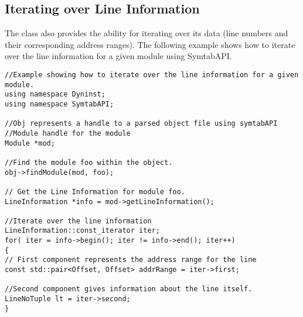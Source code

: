 \subsection{Iterating over Line Information}\label{LineNoIterating}
The  class also provides the ability for iterating over its data (line numbers and their corresponding address ranges). The following example shows how to iterate over the line information for a given module using SymtabAPI.

\begin{lstlisting}
//Example showing how to iterate over the line information for a given module.
using namespace Dyninst;
using namespace SymtabAPI;

//Obj represents a handle to a parsed object file using symtabAPI
//Module handle for the module
Module *mod;

//Find the module foo within the object.
obj->findModule(mod, foo);

// Get the Line Information for module foo.
LineInformation *info = mod->getLineInformation();

//Iterate over the line information
LineInformation::const_iterator iter;
for( iter = info->begin(); iter != info->end(); iter++)
{
// First component represents the address range for the line
const std::pair<Offset, Offset> addrRange = iter->first;

//Second component gives information about the line itself.
LineNoTuple lt = iter->second;
}
\end{lstlisting}
